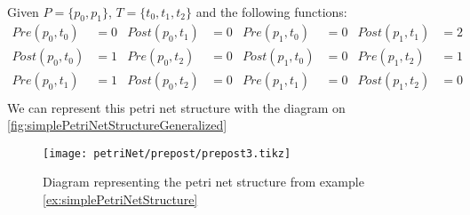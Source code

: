 \begin{example} ~\\
  \label{ex:simplePetriNetStructure}
  Given $P = \{p_0,p_1\}$, $T = \{t_0,t_1,t_2\}$ and the following functions:
  \begin{align*}
   Pre(p_0,t_0)& = 0  &  Post(p_0,t_1) &= 0 & Pre(p_1,t_0) &= 0 &  Post(p_1,t_1) &= 2 \\
   Post(p_0,t_0) &= 1  &    Pre(p_0,t_2) &= 0   & Post(p_1,t_0) &= 0   & Pre(p_1,t_2) &= 1\\
   Pre(p_0,t_1) &= 1    &  Post(p_0,t_2) &= 0  &  Pre(p_1,t_1) &= 0     &Post(p_1,t_2) &= 0\\
  \end{align*}
  We can represent this petri net structure with the diagram on \autoref{fig:simplePetriNetStructureGeneralized}
\end{example}
\begin{figure}[H]
  \centering
  \texttt{[image: petriNet/prepost/prepost3.tikz]}
  \caption{Diagram representing the petri net structure from example \ref{ex:simplePetriNetStructure}}
\label{fig:simplePetriNetStructureGeneralized}
\end{figure}


